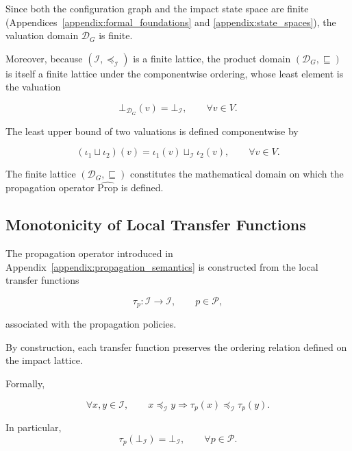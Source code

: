 \documentclass[10pt]{article}
\begin{document}
Since both the configuration graph and the impact state space are finite
(Appendices~\ref{appendix:formal_foundations} and
\ref{appendix:state_spaces}), the valuation domain
$\mathcal D_G$ is finite.

Moreover, because
$\left(\mathcal I,\preceq_{\mathcal I}\right)$
is a finite lattice, the product domain
$\left(\mathcal D_G,\sqsubseteq\right)$
is itself a finite lattice under the componentwise ordering, whose least
element is the valuation

\begin{equation}
	\label{eq:bottom_valuation}
	\bot_{\mathcal D_G}(v)
	=
	\bot_{\mathcal I},
	\qquad
	\forall v\in V.
\end{equation}

The least upper bound of two valuations is defined componentwise by

\begin{equation}
	\label{eq:valuation_join}
	(\iota_1
	\sqcup
	\iota_2)(v)
	=
	\iota_1(v)
	\sqcup_{\mathcal I}
	\iota_2(v),
	\qquad
	\forall v\in V.
\end{equation}

The finite lattice
$\left(\mathcal D_G,\sqsubseteq\right)$
constitutes the mathematical domain on which the propagation operator
$\widehat{\mathrm{Prop}}$ is defined.

\subsection{Monotonicity of Local Transfer Functions}
\label{appendix:local_monotonicity}
The propagation operator introduced in
Appendix~\ref{appendix:propagation_semantics}
is constructed from the local transfer functions

\[
\tau_p :
\mathcal I
\rightarrow
\mathcal I,
\qquad
p\in\mathcal P,
\]

associated with the propagation policies.

By construction, each transfer function preserves the ordering relation defined
on the impact lattice.

Formally,

\begin{equation}
	\label{eq:transfer_monotone}
	\forall
	x,y
	\in
	\mathcal I,
	\qquad
	x
	\preceq_{\mathcal I}
	y
	\Longrightarrow
	\tau_p(x)
	\preceq_{\mathcal I}
	\tau_p(y).
\end{equation}

In particular,
\begin{equation}
	\tau_p
	\left(
	\bot_{\mathcal I}
	\right)
	=
	\bot_{\mathcal I},
	\qquad
	\forall p\in\mathcal P.
	\label{eq:transfer_bottom_preservation}
\end{equation}
\end{document}

